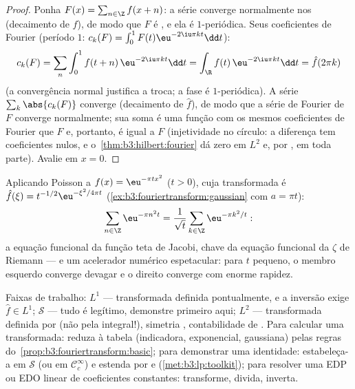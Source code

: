 \begin{proof}
Ponha $F(x) = \sum_{n\in\Z}f(x + n)$: a série converge normalmente nos  (decaimento de
$f$), de modo que $F$ é , e ela é $1$-periódica. Seus
coeficientes de Fourier (período $1$: $c_k(F) = \int_0^1F(t)\eu^{-2\iu\pi kt}\dd t$):
\[
c_k(F) = \sum_n\int_0^1 f(t + n)\,\eu^{-2\iu\pi kt}\dd t
= \int_\R f(t)\,\eu^{-2\iu\pi kt}\dd t = \hat f(2\pi k)
\]
(a convergência normal justifica a troca; a fase é $1$-periódica). A
série $\sum_k\abs{c_k(F)}$ converge (decaimento de $\hat f$), de modo que a série de
Fourier de $F$ converge normalmente; sua soma é uma função 
com os mesmos coeficientes de Fourier que $F$ e, portanto, é igual a
$F$ (injetividade no círculo: a diferença tem coeficientes nulos, e
o~\cref{thm:b3:hilbert:fourier} dá zero em $L^2$ e, por , em toda
parte). Avalie em $x = 0$.
\end{proof}

\begin{example}
\label{ex:b3:fouriertransform:theta}
Aplicando Poisson a $f(x) = \eu^{-\pi tx^2}$ ($t > 0$), cuja transformada é $\hat f(\xi) = t^{-1/2}\eu^{-\xi^2/4\pi t}$
(\cref{ex:b3:fouriertransform:gaussian} com $a = \pi t$):
\[
\sum_{n\in\Z}\eu^{-\pi n^2t}
= \frac1{\sqrt t}\sum_{k\in\Z}\eu^{-\pi k^2/t} :
\]
a equação funcional da função teta de Jacobi, chave da equação
funcional da $\zeta$ de Riemann --- e um acelerador numérico
espetacular: para $t$ pequeno, o membro esquerdo converge devagar e
o direito converge com enorme rapidez.
\end{example}

\begin{method}\label{met:b3:fouriertransform:method}
Faixas de trabalho: $L^1$ --- transformada definida pontualmente, e
a inversão exige $\hat f \in L^1$; $\mathcal S$ --- tudo é legítimo, demonstre primeiro
aqui; $L^2$ --- transformada definida por  (não pela
integral!), simetria , contabilidade de . Para calcular
uma transformada: reduza à tabela (indicadora, exponencial, gaussiana)
pelas regras do~\cref{prop:b3:fouriertransform:basic}; para demonstrar uma identidade:
estabeleça-a em $\mathcal S$ (ou em $\mathcal C_c^\infty$) e estenda por  e
 (\cref{met:b3:lp:toolkit}); para resolver uma EDP ou EDO linear de
coeficientes constantes: transforme, divida, inverta.
\end{method}

